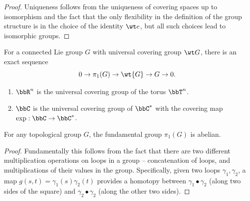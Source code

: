 \begin{proof}

    
    Uniqueness follows from the uniqueness of covering spaces up to isomorphism and the fact that the only flexibility in the definition of the group structure is in the choice of the identity $\wt e$, but all such choices lead to isomorphic groups.
\end{proof}

\begin{cor}
    For a connected Lie group $G$ with universal covering group $\wt G$, there is an exact sequence
    \[0\to \pi_1(G)\to \wt{G}\to G\to 0.\]
\end{cor}

\begin{example}
    \begin{enumerate}[label=(\alph*)]
        \item $\bbR^n$ is the universal covering group of the torus $\bbT^n$.
        \item $\bbC$ is the universal covering group of $\bbC^\ast$ with the covering map $\exp:\bbC\to\bbC^\ast$.
    \end{enumerate}
\end{example}


\begin{prop}
    For any topological group $G$, the fundamental group $\pi_1(G)$ is abelian.
\end{prop}
\begin{proof}
    Fundamentally this follows from the fact that there are two different multiplication operations on loops in a group -- concatenation of loops, and multiplications of their values in the group. Specifically, given two loops $\gamma_1,\gamma_2$, a map $g(s,t)=\gamma_1(s)\gamma_2(t)$ provides a homotopy between $\gamma_1\bullet \gamma_2$ (along two sides of the square) and $\gamma_2\bullet\gamma_2$ (along the other two sides).
\end{proof}

